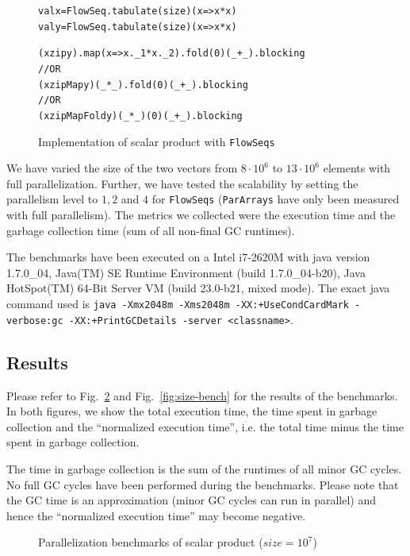 \documentclass[runningheads,a4paper,fleqn]{llncs}
\begin{document}
\begin{figure}
\begin{minipage}[t]{6cm}
\begin{alltt}
{\scriptsize
val x = FlowSeq.tabulate(size)(x => x*x)
val y = FlowSeq.tabulate(size)(x => x*x)

(x zip y).map(x => x._1 * x._2).fold(0)(_ + _).blocking
// OR
(x zipMap y)(_ * _).fold(0)(_ + _).blocking
// OR
(x zipMapFold y)(_ * _)(0)(_ + _).blocking
}
\end{alltt}
\end{minipage}
\caption{Implementation of scalar product with \texttt{FlowSeqs}}
\label{fig:scalar-product}
\end{figure}

We have varied the size of the two vectors from $8 \cdot 10^6$ to $13
\cdot 10^6$ elements with full parallelization. Further, we have
tested the scalability by setting the parallelism level to $1,2$ and
$4$ for \texttt{FlowSeqs} (\texttt{ParArrays} have only been measured with full
parallelism). The metrics we collected were the execution time and the
garbage collection time (sum of all non-final GC runtimes).

The benchmarks have been executed on a Intel i7-2620M with java
version 1.7.0\_04, Java(TM) SE Runtime Environment (build
1.7.0\_04-b20), Java HotSpot(TM) 64-Bit Server VM (build 23.0-b21,
mixed mode). The exact java command used is \texttt{java -Xmx2048m
  -Xms2048m -XX:+UseCondCardMark -verbose:gc -XX:+PrintGCDetails
  -server <classname>}.

\subsection{Results}

Please refer to Fig.~\ref{fig:par-bench} and Fig.~\ref{fig:size-bench}
for the 
results of the benchmarks. In both figures, we show the total
execution time, the time spent in garbage collection and the
``normalized execution time'', i.e. the total time minus the time
spent in garbage collection.

The time in garbage collection is the sum of the runtimes of all minor
GC cycles. No full GC cycles have been performed during the
benchmarks. Please note that the GC time is an approximation (minor GC
cycles can run in parallel) and hence the ``normalized execution
time'' may become negative.

\begin{figure}
\caption{Parallelization benchmarks of scalar product ($size = 10^7$)}
\label{fig:par-bench}
\end{figure}
\end{document}
